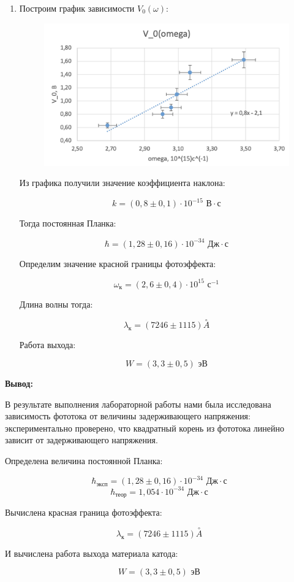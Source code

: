 \documentclass[a4paper, 12pt]{article}%
\begin{document}
\begin{enumerate}
\item Построим график зависимости $V_0(\omega)$:

	\begin{figure}[h!]
	    \centering
		\includegraphics[scale=0.7]{График_10.PNG}
	\end{figure}
	
	Из графика получили значение коэффициента наклона:
	
	\[k = (0,8 \pm 0,1) \cdot 10^{-15} \text{ В} \cdot \text{с}\]
	
	Тогда постоянная Планка:
	
	\[\hbar = (1,28 \pm 0,16) \cdot 10^{-34} \text{ Дж} \cdot \text{с}\]

	 Определим значение красной границы фотоэффекта:
	 
	\[\omega_\text{к} = (2,6 \pm 0,4)\cdot 10^{15} \text{ с}^{-1}\]	 
	 
	Длина волны тогда:
	
	\[\lambda_\text{к} = (7246 \pm 1115) \stackrel{\circ}{A}\] 
	
	Работа выхода:
		 
	\[W = (3,3 \pm 0,5) \text{ эВ}\]	
	  
\end{enumerate}

\textbf{Вывод:}\\\par

В результате выполнения лабораторной работы нами была исследована зависимость фототока от величины задерживающего напряжения: экспериментально проверено,  что квадратный корень из фототока линейно зависит от задерживающего напряжения.

Определена величина постоянной Планка:

\[\hbar_\text{эксп} = (1,28 \pm 0,16) \cdot 10^{-34} \text{ Дж} \cdot \text{с}\]
\[\hbar_\text{теор} = 1,054 \cdot 10^{-34} \text{ Дж} \cdot \text{с}\]

Вычислена красная граница фотоэффекта:

\[\lambda_\text{к} = (7246 \pm 1115) \stackrel{\circ}{A}\] 

И вычислена работа выхода материала катода:

\[W = (3,3 \pm 0,5) \text{ эВ}\]
	
\end{document}
